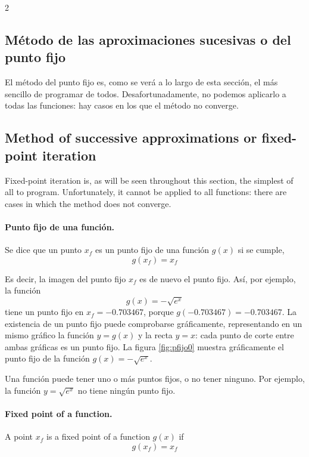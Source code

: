 \begin{paracol}{2}

 \subsection{Método de las aproximaciones sucesivas o del punto fijo}\label{pfijo}

El método del punto fijo es, como se verá a lo largo de esta sección, el más sencillo de programar de todos. Desafortunadamente, no podemos aplicarlo a todas las funciones: hay casos en los que el método no converge.
 \switchcolumn


\subsection{Method of successive approximations or fixed-point iteration}\label{pfijo-2}

Fixed-point iteration is, as will be seen throughout this section, the simplest of all to program. Unfortunately, it cannot be applied to all functions: there are cases in which the method does not converge.

\switchcolumn

\paragraph{Punto fijo de una función.} Se dice que un punto $x_f$ es un punto fijo de una función $g(x)$ si se cumple,
\begin{equation*}
g(x_f)=x_f
\end{equation*}

Es decir, la imagen del punto fijo $x_f$ es de nuevo el punto fijo. Así, por ejemplo, la función
\begin{equation*}
g(x)=-\sqrt{e^x}
\end{equation*}
tiene un punto fijo en $x_f=-0.703467$, porque $g(-0.703467)=-0.703467$. La existencia de un punto fijo puede comprobarse gráficamente, representando en un mismo gráfico la función $y=g(x)$ y la recta $y=x$: cada punto de corte entre ambas gráficas es un punto fijo. La figura \ref{fig:pfijo0} muestra gráficamente el punto fijo de la función $g(x)=-\sqrt{e^x}$.

Una función puede tener uno o más puntos fijos, o no tener ninguno. Por ejemplo, la función $y=\sqrt{e^x}$ no tiene ningún punto fijo.

\switchcolumn
\paragraph{Fixed point of a function.}  A point $x_f$ is a fixed point of a function $g(x)$ if
\begin{equation*}
g(x_f)=x_f
\end{equation*}


\end{paracol}
